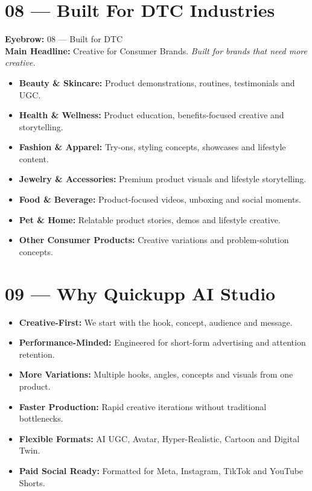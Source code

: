 \documentclass[11pt,a4paper]{article}
\begin{document}
\section{08 --- Built For DTC Industries}
\textbf{Eyebrow:} 08 — Built for DTC \\
\textbf{Main Headline:} Creative for Consumer Brands. \textit{Built for brands that need more creative.}
\begin{itemize}[noitemsep]
    \item \textbf{Beauty \& Skincare:} Product demonstrations, routines, testimonials and UGC.
    \item \textbf{Health \& Wellness:} Product education, benefits-focused creative and storytelling.
    \item \textbf{Fashion \& Apparel:} Try-ons, styling concepts, showcases and lifestyle content.
    \item \textbf{Jewelry \& Accessories:} Premium product visuals and lifestyle storytelling.
    \item \textbf{Food \& Beverage:} Product-focused videos, unboxing and social moments.
    \item \textbf{Pet \& Home:} Relatable product stories, demos and lifestyle creative.
    \item \textbf{Other Consumer Products:} Creative variations and problem-solution concepts.
\end{itemize}

\section{09 --- Why Quickupp AI Studio}
\begin{itemize}[noitemsep]
    \item \textbf{Creative-First:} We start with the hook, concept, audience and message.
    \item \textbf{Performance-Minded:} Engineered for short-form advertising and attention retention.
    \item \textbf{More Variations:} Multiple hooks, angles, concepts and visuals from one product.
    \item \textbf{Faster Production:} Rapid creative iterations without traditional bottlenecks.
    \item \textbf{Flexible Formats:} AI UGC, Avatar, Hyper-Realistic, Cartoon and Digital Twin.
    \item \textbf{Paid Social Ready:} Formatted for Meta, Instagram, TikTok and YouTube Shorts.
\end{itemize}
\end{document}
